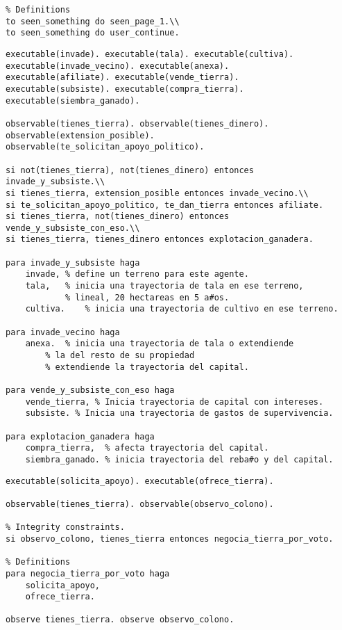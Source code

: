 \documentclass{article}
\begin{document}
\begin{huge}
\begin{verbatim}
% Definitions
to seen_something do seen_page_1.\\
to seen_something do user_continue.
\end{verbatim}


\begin{verbatim}
executable(invade). executable(tala). executable(cultiva).
executable(invade_vecino). executable(anexa).
executable(afiliate). executable(vende_tierra).
executable(subsiste). executable(compra_tierra).
executable(siembra_ganado).

observable(tienes_tierra). observable(tienes_dinero).
observable(extension_posible).
observable(te_solicitan_apoyo_politico).

si not(tienes_tierra), not(tienes_dinero) entonces
invade_y_subsiste.\\
si tienes_tierra, extension_posible entonces invade_vecino.\\
si te_solicitan_apoyo_politico, te_dan_tierra entonces afiliate.
si tienes_tierra, not(tienes_dinero) entonces
vende_y_subsiste_con_eso.\\
si tienes_tierra, tienes_dinero entonces explotacion_ganadera.

para invade_y_subsiste haga
    invade, % define un terreno para este agente.
    tala,   % inicia una trayectoria de tala en ese terreno,
            % lineal, 20 hectareas en 5 a#os.
    cultiva.    % inicia una trayectoria de cultivo en ese terreno.

para invade_vecino haga
    anexa.  % inicia una trayectoria de tala o extendiende
        % la del resto de su propiedad
        % extendiende la trayectoria del capital.

para vende_y_subsiste_con_eso haga
    vende_tierra, % Inicia trayectoria de capital con intereses.
    subsiste. % Inicia una trayectoria de gastos de supervivencia.

para explotacion_ganadera haga
    compra_tierra,  % afecta trayectoria del capital.
    siembra_ganado. % inicia trayectoria del reba#o y del capital.
\end{verbatim}


\begin{verbatim}
executable(solicita_apoyo). executable(ofrece_tierra).

observable(tienes_tierra). observable(observo_colono).

% Integrity constraints.
si observo_colono, tienes_tierra entonces negocia_tierra_por_voto.

% Definitions
para negocia_tierra_por_voto haga
    solicita_apoyo,
    ofrece_tierra.

observe tienes_tierra. observe observo_colono.
\end{verbatim}

\end{huge}
\end{document}
